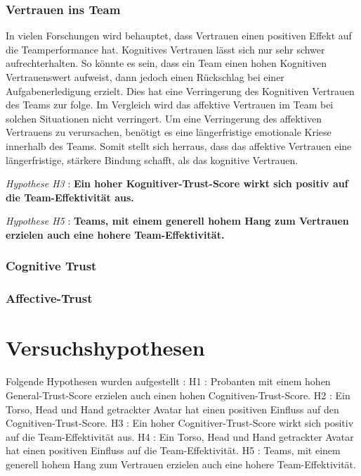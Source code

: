\documentclass[a4paper,11pt]{article}%
\renewcommand{\\}{\vspace*{0.5\baselineskip} \newline}
\begin{document}
{\subsubsection{Vertrauen ins Team}

In vielen Forschungen wird behauptet, dass Vertrauen einen positiven Effekt auf die Teamperformance hat. \citep{mcallister1995affect} \citep{mayer1995integrative} \citep{dirks2002trust}
Kognitives Vertrauen lässt sich nur sehr schwer aufrechterhalten. So könnte es sein, dass ein Team einen hohen Kognitiven Vertrauenswert aufweist, dann jedoch einen Rückschlag bei einer Aufgabenerledigung erzielt. Dies hat eine Verringerung des Kognitiven Vertrauen des Teams zur folge. \citep[p.29-31]{mcallister1995affect}
Im Vergleich wird das affektive Vertrauen im Team bei solchen Situationen nicht verringert. Um eine Verringerung des affektiven Vertrauens zu verursachen, benötigt es eine längerfristige emotionale Kriese innerhalb des Teams. Somit stellt sich herraus, dass das affektive Vertrauen eine längerfristige, stärkere Bindung schafft, als das kognitive Vertrauen.  \citep[p.29-31]{mcallister1995affect} \\

\textit{Hypothese H3} : \textbf{Ein hoher Kognitiver-Trust-Score wirkt sich positiv auf die Team-Effektivität aus.}\\

\textit{Hypothese H5} : \textbf{Teams, mit einem generell hohem Hang zum Vertrauen erzielen auch eine hohere Team-Effektivität.}

		\subsubsection{Cognitive Trust}
		
		\subsubsection{Affective-Trust}
		
	\newpage
	\section{Versuchshypothesen}

Folgende Hypothesen wurden aufgestellt :\\
H1 : Probanten mit einem hohen General-Trust-Score erzielen auch einen hohen Cognitiven-Trust-Score. \\
H2 : Ein Torso, Head und Hand getrackter Avatar hat einen positiven Einfluss auf den Cognitiven-Trust-Score.\\
H3 : Ein hoher Cognitiver-Trust-Score wirkt sich positiv auf die Team-Effektivität aus.\\
H4 : Ein Torso, Head und Hand getrackter Avatar hat einen positiven Einfluss auf die Team-Effektivität.\\
H5 : Teams, mit einem generell hohem Hang zum Vertrauen erzielen auch eine hohere Team-Effektivität.\\

}
\end{document}
